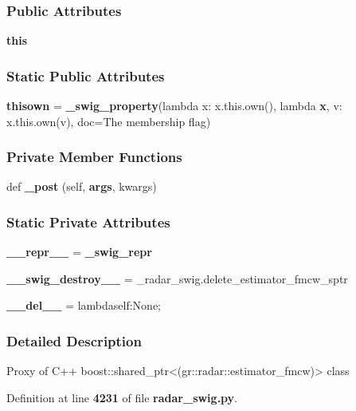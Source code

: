 \subsubsection*{Public Attributes}
\begin{DoxyCompactItemize}
\item 
{\bf this}
\end{DoxyCompactItemize}
\subsubsection*{Static Public Attributes}
\begin{DoxyCompactItemize}
\item 
{\bf thisown} = {\bf \+\_\+swig\+\_\+property}(lambda x\+: x.\+this.\+own(), lambda {\bf x}, v\+: x.\+this.\+own(v), doc=\textquotesingle{}The membership flag\textquotesingle{})
\end{DoxyCompactItemize}
\subsubsection*{Private Member Functions}
\begin{DoxyCompactItemize}
\item 
def {\bf \+\_\+post} (self, {\bf args}, kwargs)
\end{DoxyCompactItemize}
\subsubsection*{Static Private Attributes}
\begin{DoxyCompactItemize}
\item 
{\bf \+\_\+\+\_\+repr\+\_\+\+\_\+} = {\bf \+\_\+swig\+\_\+repr}
\item 
{\bf \+\_\+\+\_\+swig\+\_\+destroy\+\_\+\+\_\+} = \+\_\+radar\+\_\+swig.\+delete\+\_\+estimator\+\_\+fmcw\+\_\+sptr
\item 
{\bf \+\_\+\+\_\+del\+\_\+\+\_\+} = lambdaself\+:\+None;
\end{DoxyCompactItemize}


\subsubsection{Detailed Description}
\begin{DoxyVerb}Proxy of C++ boost::shared_ptr<(gr::radar::estimator_fmcw)> class\end{DoxyVerb}
 

Definition at line {\bf 4231} of file {\bf radar\+\_\+swig.\+py}.



